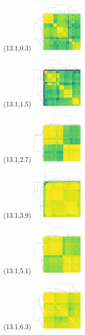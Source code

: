 \documentclass{article}
\begin{document}
\begin{textblock}{1}(13.1,0.3)  \includegraphics[height=1in]{main-figure-assets/clustermaps/5qtel_1-500K_1_12_12_rc.pdf}  \end{textblock}
\begin{textblock}{1}(13.1,1.5)  \includegraphics[height=1in]{main-figure-assets/clustermaps/6qtel_1-500K_1_12_12_rc.pdf}  \end{textblock}
\begin{textblock}{1}(13.1,2.7)  \includegraphics[height=1in]{main-figure-assets/clustermaps/chr7.pdf}                     \end{textblock}
\begin{textblock}{1}(13.1,3.9)  \includegraphics[height=1in]{main-figure-assets/clustermaps/chr8.pdf}                     \end{textblock}
\begin{textblock}{1}(13.1,5.1)  \includegraphics[height=1in]{main-figure-assets/clustermaps/chr11.pdf}                    \end{textblock}
\begin{textblock}{1}(13.1,6.3)  \includegraphics[height=1in]{main-figure-assets/clustermaps/chr12.pdf}                    \end{textblock}
\end{document}
